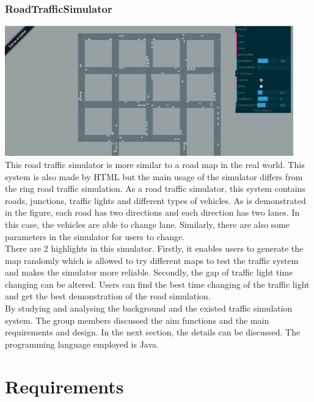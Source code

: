\documentclass[a4paper,12pt]{article}
\begin{document}
\subsubsection{RoadTrafficSimulator}
\includegraphics[width=12.5cm]{RoadTrafficSimulator.eps}\\
This road traffic simulator is more similar to a road map in the real world. This system is also made by HTML but the main usage of the simulator differs from the ring road traffic simulation. As a road traffic simulator, this system contains roads, junctions, traffic lights and different types of vehicles.
As is demonstrated in the figure, each road has two directions and each direction has two lanes. In this case, the vehicles are able to change lane. Similarly, there are also some parameters in the simulator for users to change.\\
There are 2 highlights in this simulator. Firstly, it enables users to generate the map randomly which is allowed to try different maps to test the traffic system and makes the simulator more reliable. Secondly, the gap of traffic light time changing can be altered. Users can find the best time changing of the traffic light and get the best demonstration of the road simulation.\\
By studying and analysing the background and the existed traffic simulation system. The group members discussed the aim functions and the main requirements and design. In the next section, the details can be discussed. The programming language employed is Java.\\

\section{Requirements}
\end{document}
